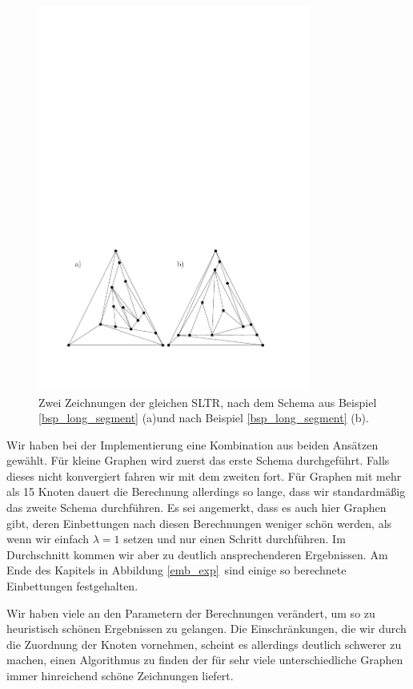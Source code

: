 \begin{figure}
	\centering
  \includegraphics[width=0.8\textwidth]{ex_large_corner.pdf}
  \caption{Zwei Zeichnungen der gleichen SLTR, nach dem Schema aus Beispiel \ref{bsp_long_segment} (a)und nach Beispiel \ref{bsp_long_segment} (b).}
  \label{large_corner}
\end{figure}

Wir haben bei der Implementierung eine Kombination aus beiden Ansätzen gewählt. Für kleine Graphen wird zuerst das erste Schema durchgeführt. Falls dieses nicht konvergiert fahren wir mit dem zweiten fort. Für Graphen mit mehr als 15 Knoten dauert die Berechnung allerdings so lange, dass wir standardmäßig das zweite Schema durchführen. Es sei angemerkt, dass es auch hier Graphen gibt, deren Einbettungen nach diesen Berechnungen weniger schön werden, als wenn wir einfach $\lambda=1$ setzen und nur einen Schritt durchführen. Im Durchschnitt kommen wir aber zu deutlich ansprechenderen Ergebnissen. Am Ende des Kapitels in Abbildung \ref{emb_exp} sind einige so berechnete Einbettungen festgehalten.

\begin{remark}
Wir haben viele an den Parametern der Berechnungen verändert, um so zu heuristisch schönen Ergebnissen zu gelangen. Die Einschränkungen, die wir durch die Zuordnung der Knoten vornehmen, scheint es allerdings deutlich schwerer zu machen, einen Algorithmus zu finden der für sehr viele unterschiedliche Graphen immer hinreichend schöne Zeichnungen liefert.
\end{remark}

